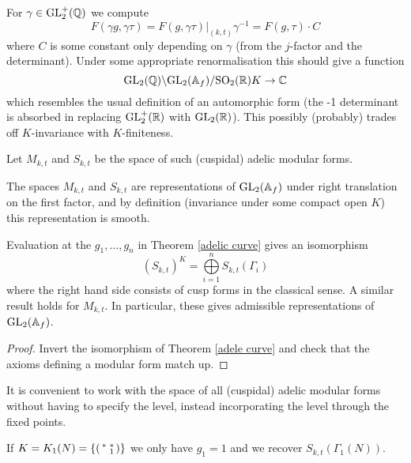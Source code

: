 \begin{rem}
    For $\gamma \in \mathrm{GL}_2^+(\mathbb{Q})$ we compute $$F(\gamma g, \gamma \tau) = F(g,\gamma\tau)|_{(k,t)}\gamma^{-1} = F(g,\tau) \cdot C$$ where $C$ is some constant only depending on $\gamma$ (from the $j$-factor and the determinant). Under some appropriate renormalisation this should give a function
    $$\mathrm{GL}_2(\mathbb{Q}) \backslash \mathrm{GL}_2(\mathbb{A}_f)/\mathrm{SO}_2(\mathbb{R})K \to \mathbb{C}$$ which resembles the usual definition of an automorphic form (the -1 determinant is absorbed in replacing $\mathrm{GL}_2^+(\mathbb{R})$ with $\mathrm{GL}_2(\mathbb{R})$). This possibly (probably) trades off $K$-invariance with $K$-finiteness.
\end{rem}
\begin{notn}
    Let $M_{k,t}$ and $S_{k,t}$ be the space of such (cuspidal) adelic modular forms.
\end{notn}
The spaces $M_{k,t}$ and $S_{k,t}$ are representations of $\mathrm{GL}_2(\mathbb{A}_f)$ under right translation on the first factor, and by definition (invariance under some compact open $K$) this representation is smooth.

\begin{prop}
    Evaluation at the $g_1,\dots,g_n$ in Theorem \ref{adelic curve} gives an isomorphism 
    $$(S_{k,t})^K = \bigoplus\limits_{i=1}^n S_{k,t}(\Gamma_i)$$
    where the right hand side consists of cusp forms in the classical sense. A similar result holds for $M_{k,t}$. In particular, these gives admissible representations of $\mathrm{GL}_2(\mathbb{A}_f)$.
\end{prop}
\begin{proof}
    Invert the isomorphism of Theorem \ref{adele curve} and check that the axioms defining a modular form match up.
\end{proof}

\begin{rem}
    It is convenient to work with the space of all (cuspidal) adelic modular forms without having to specify the level, instead incorporating the level through the fixed points.
\end{rem}
\begin{example}
    If $K=K_1(N) = \left\{\begin{psmallmatrix}
        * & * \\ & 1
    \end{psmallmatrix}\right\}$ we only have $g_1=1$ and we recover $S_{k,t}(\Gamma_1(N))$.
\end{example}
